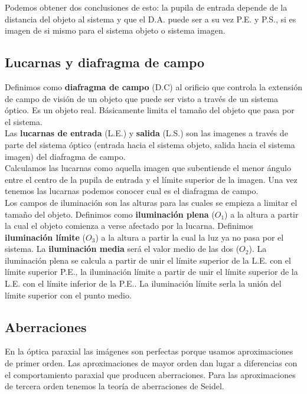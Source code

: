 \documentclass[12pt,a4paper]{article}
\numberwithin{equation}{section}
\numberwithin{figure}{section}
\begin{document}
Podemos obtener dos conclusiones de esto: la pupila de entrada depende de la distancia del objeto al sistema y que el D.A. puede ser a su vez P.E. y P.S., si es imagen de si mismo para el sistema objeto o sistema imagen. \\

\subsection{Lucarnas y diafragma de campo}

Definimos como \textbf{diafragma de campo} (D.C) al orificio que controla la extensión de campo de visión de un objeto que puede ser visto a través de un sistema óptico. Es un objeto real. Básicamente limita el tamaño del objeto que pasa por el sistema. \\

Las \textbf{lucarnas de entrada} (L.E.) y \textbf{salida} (L.S.) son las imagenes a través de parte del sistema óptico (entrada hacia el sistema objeto, salida hacia el sistema imagen) del diafragma de campo. \\

Calculamos las lucarnas como aquella imagen que subentiende el menor ángulo entre el centro de la pupila de entrada y el límite superior de la imagen. Una vez tenemos las lucarnas podemos conocer cual es el diafragma de campo. \\

Los campos de iluminación son las alturas para las cuales se empieza a limitar el tamaño del objeto. Definimos como \textbf{iluminación plena} ($O_1$) a la altura a partir la cual el objeto comienza a verse afectado por la lucarna. Definimos \textbf{iluminación límite} ($O_3$) a la altura a partir la cual la luz ya no pasa por el sistema. La \textbf{iluminación media} será el valor medio de las dos ($O_2$). La iluminación plena se calcula a partir de unir el límite superior de la L.E. con el límite superior P.E., la iluminación límite a partir de unir el límite superior de la L.E. con el límite inferior de la P.E.. La iluminación límite serla la unión del límite superior con el punto medio.

\subsection{Aberraciones}

En la óptica paraxial las imágenes son perfectas porque usamos aproximaciones de primer orden. Las aproximaciones de mayor orden dan lugar a diferencias con el comportamiento paraxial que producen aberraciones. Para las aproximaciones de tercera orden tenemos la teoría de aberraciones de Seidel. \\
\end{document}
